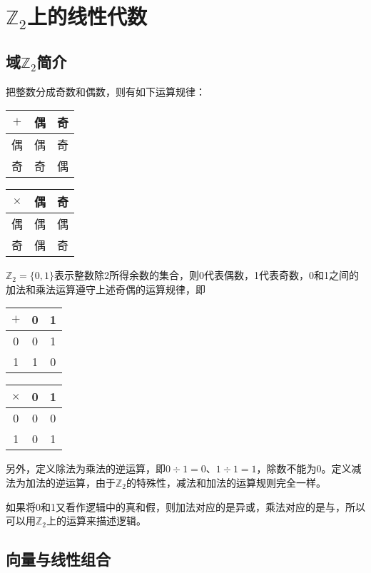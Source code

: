 \section{$\mathbb{Z}_2$上的线性代数}
\subsection{域$\mathbb{Z}_2$简介}
把整数分成奇数和偶数，则有如下运算规律：
\begin{center}
\begin{tabular}{|c|cc|}
\hline
$+$&偶&奇\\\hline
偶&偶&奇\\
奇&奇&偶\\\hline
\end{tabular}
\begin{tabular}{|c|cc|}
\hline
$\times$&偶&奇\\\hline
偶&偶&偶\\
奇&偶&奇\\\hline
\end{tabular}
\end{center}

$\mathbb{Z}_2=\{0,1\}$表示整数除2所得余数的集合，则0代表偶数，1代表奇数，0和1之间的加法和乘法运算遵守上述奇偶的运算规律，即
\begin{center}
\begin{tabular}{|c|cc|}
\hline
$+$&0&1\\\hline
0&0&1\\
1&1&0\\\hline
\end{tabular}
\begin{tabular}{|c|cc|}
\hline
$\times$&0&1\\\hline
0&0&0\\
1&0&1\\\hline
\end{tabular}
\end{center}

另外，定义除法为乘法的逆运算，即$0\div 1=0$、$1\div 1=1$，除数不能为0。定义减法为加法的逆运算，由于$\mathbb{Z}_2$的特殊性，减法和加法的运算规则完全一样。

如果将0和1又看作逻辑中的真和假，则加法对应的是异或，乘法对应的是与，所以可以用$\mathbb{Z}_2$上的运算来描述逻辑。

\subsection{向量与线性组合}